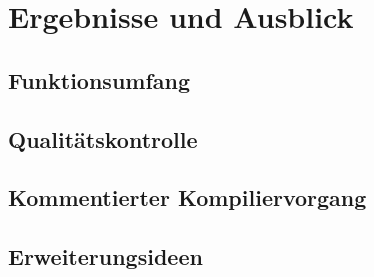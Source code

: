 \chapter{Ergebnisse und Ausblick}
\section{Funktionsumfang}
\section{Qualitätskontrolle}
\section{Kommentierter Kompiliervorgang}
\section{Erweiterungsideen}
